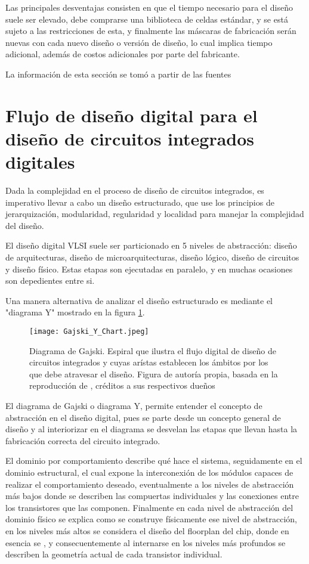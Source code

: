 {Las principales desventajas consisten en que el tiempo necesario para el diseño suele ser elevado, debe comprarse una biblioteca de celdas estándar, y se está sujeto a las restricciones de esta, y finalmente las máscaras de fabricación serán nuevas con cada nuevo diseño o versión de diseño, lo cual implica tiempo adicional, además de costos adicionales por parte del fabricante.

La información de esta sección se tomó a partir de las fuentes \cite{book:raj2008,book:johnM1997,book:raj2008}

\section{Flujo de diseño digital para el diseño de circuitos integrados digitales}

Dada la complejidad en el proceso de diseño de circuitos integrados, es imperativo llevar a cabo un diseño estructurado, que use los principios de jerarquización, modularidad, regularidad y localidad para manejar la complejidad del diseño.

El diseño digital VLSI suele ser particionado en 5 niveles de abstracción: diseño de arquitecturas, diseño de microarquitecturas, diseño lógico, diseño de circuitos y diseño físico. Estas etapas son ejecutadas en paralelo, y en muchas ocasiones son depedientes entre si.

Una manera alternativa de analizar el diseño estructurado es mediante el "diagrama Y" mostrado en la figura \ref{Ychart}. 

\begin{figure}[h]
\texttt{[image: Gajski\_Y\_Chart.jpeg]}
\centering
\caption{Diagrama de Gajski. Espiral que ilustra el flujo digital de diseño de circuitos integrados y cuyas arístas establecen los ámbitos por los que debe atravesar el diseño. Figura de autoría propia, basada en la reproducción de \cite{book:weste2005}, créditos a sus respectivos dueños}
\label{Ychart}
\end{figure}

El diagrama de Gajski o diagrama Y, permite entender el concepto de abstracción en el diseño digital, pues se parte desde un concepto general de diseño y al interiorizar en el diagrama se desvelan las etapas que llevan hasta la fabricación correcta del circuito integrado.

El dominio por comportamiento describe qué hace el sistema, seguidamente en el dominio estructural, el cual expone la interconexión de los módulos capaces de realizar el comportamiento deseado, eventualmente a los niveles de abstracción más bajos donde se describen las compuertas individuales y las conexiones entre los transistores que las componen. Finalmente en cada nivel de abstracción del dominio físico se explica como se construye físicamente ese nivel de abstracción, en los niveles más altos se considera el diseño del floorplan del chip, donde en esencia se , y consecuentemente al internarse en los niveles más profundos se describen la geometría actual de cada transistor individual.

}
